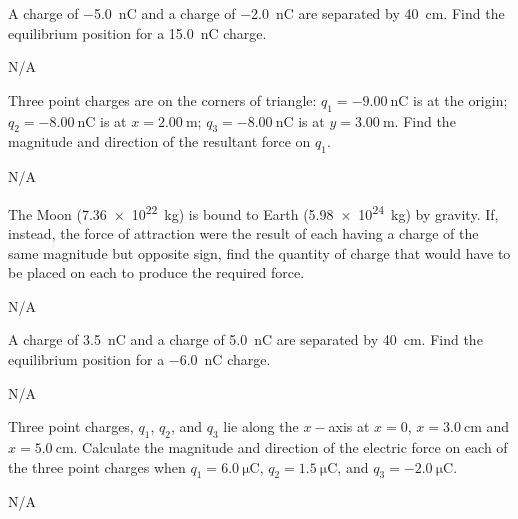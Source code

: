 


\begin{question}[ID=coulomb-A-Q01,topic=coulomb,difficulty=A]
    A charge of \SI{-5.0}{\nano\coulomb} and a charge of
        \SI{-2.0}{\nano\coulomb} are separated by
        \SI{40}{\centi\meter}.
    Find the equilibrium position for a
        \SI[retain-explicit-plus]{+15.0}{\nano\coulomb} charge.
\end{question}
\begin{solution}
    N/A
\end{solution}


\begin{question}[ID=coulomb-A-Q02,topic=coulomb,difficulty=A]
    Three point charges are on the corners of triangle:
        $q_1=\SI{-9.00}{\nano\coulomb}$ is at the origin;
        $q_2=\SI{-8.00}{\nano\coulomb}$ is at $x=\SI{2.00}{\meter}$;
        $q_3=\SI{-8.00}{\nano\coulomb}$ is at $y=\SI{3.00}{\meter}$.
    Find the magnitude and direction of the resultant force on $q_1$.
\end{question}
\begin{solution}
    N/A
\end{solution}


\begin{question}[ID=coulomb-B-Q01,topic=coulomb,difficulty=B]
    The Moon (\SI{7.36e22}{\kilo\gram}) is bound to Earth
        (\SI{5.98e24}{\kilo\gram}) by gravity.
    If, instead, the force of attraction were the result of each
        having a charge of the same magnitude but opposite sign,
        find the quantity of charge that would have to be
        placed on each to produce the required force.
\end{question}
\begin{solution}
    N/A
\end{solution}


\begin{question}[ID=coulomb-B-Q02,topic=coulomb,difficulty=B]
    A charge of \SI{+3.5}{\nano\coulomb} and a charge of
        \SI[retain-explicit-plus]{+5.0}{\nano\coulomb}
        are separated by \SI{40}{\centi\meter}.
    Find the equilibrium position for a \SI{-6.0}{\nano\coulomb} charge.
\end{question}
\begin{solution}
    N/A
\end{solution}


\begin{question}[ID=coulomb-B-Q03,topic=coulomb,difficulty=B]
    Three point charges, $q_1$, $q_2$, and $q_3$ lie along
        the $x-$axis at $x=0$, $x=\SI{3.0}{\centi\meter}$
        and $x=\SI{5.0}{\centi\meter}$.
    Calculate the magnitude and direction of the electric force
        on each of the three point charges when
        $q_1 = \SI{+6.0}{\micro\coulomb}$,
        $q_2 = \SI{+1.5}{\micro\coulomb}$, and
        $q_3 = \SI{-2.0}{\micro\coulomb}$.
\end{question}
\begin{solution}
    N/A
\end{solution}


